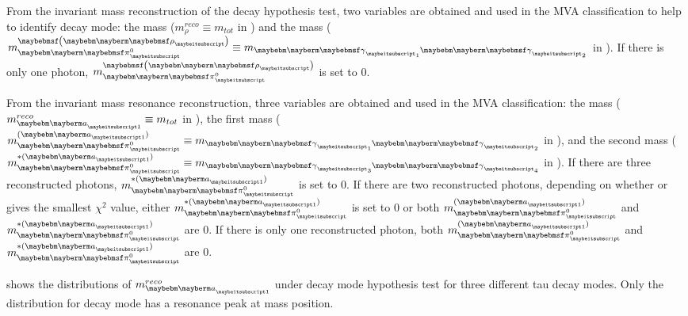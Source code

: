 



From  the \Prho invariant mass reconstruction of the \decayRhoShort  decay hypothesis test,  two variables are  obtained and  used in the MVA classification to help to identify  \decayRhoShort  decay mode: the \Prho mass ($m^{reco}_\rho \equiv m_{tot}$ in ) and the \Ppizero mass ($m_{\Pgpz}^{\parenths{\Prho}} \equiv m_{\Pphoton_1\Pphoton_2}$ in  ). If there is only one photon, $m_{\Pgpz}^{\parenths{\Prho}}$ is set to 0.

From the \Pai invariant mass resonance reconstruction, three variables are obtained and used in the MVA classification:  the \Pai mass ($m^{reco}_{\Pai} \equiv m_{tot}$ in ), the first \Ppizero mass ($m_{\Pgpz}^{(\Pai)} \equiv m_{\Pphoton_1\Pphoton_2}$ in ), and the second \Ppizero mass ($m^{*(\Pai)}_{\Pgpz} \equiv  m_{\Pphoton_3\Pphoton_4}$ in ). If there are three reconstructed photons, $m^{*(\Pai)}_{\Pgpz}$ is set to   0. If there are two reconstructed photons, depending on whether  or  gives the smallest $\chi^2$ value, either $m^{*(\Pai)}_{\Pgpz}$ is set to   0 or both $m_{\Pgpz}^{(\Pai)}$ and $m^{*(\Pai)}_{\Pgpz}$ are 0. If there is only one reconstructed photon, both $m_{\Pgpz}^{(\Pai)}$ and $m^{*(\Pai)}_{\Pgpz}$ are 0.

  shows the distributions of  $m^{reco}_{\Pai}$ under \decayAiPhotonShort decay mode hypothesis test for three different tau decay modes. Only the distribution for \decayAiPhotonShort decay mode has a resonance peak at \Pai mass position.


